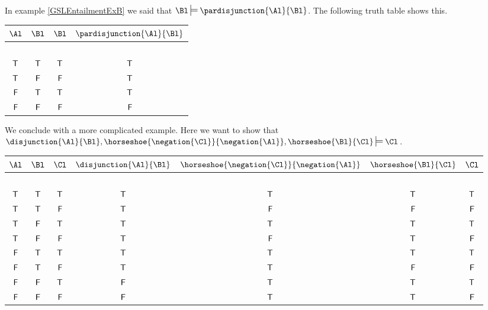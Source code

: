 \begin{majorILnc}{}
In example \ref{GSLEntailmentExB} we said that $\Bl\sdtstile{}{}\pardisjunction{\Al}{\Bl}$. 
The following truth table shows this. 
\begin{center}
\begin{tabular}{ c c c c }
$\Al$ & $\Bl$ & $\Bl$ & $\pardisjunction{\Al}{\Bl}$ \\
\hline
$ $ & $ $ & & \\[-.25cm]
$\mathsf{T}$ & $\mathsf{T}$ & $\mathsf{T}$ & $\mathsf{T}$ \\
$\mathsf{T}$ & $\mathsf{F}$& $\mathsf{F}$ & $\mathsf{T}$ \\
$\mathsf{F}$ & $\mathsf{T}$ & $\mathsf{T}$ & $\mathsf{T}$ \\
$\mathsf{F}$ & $\mathsf{F}$  & $\mathsf{F}$ & $\mathsf{F}$ \\
\end{tabular}
\end{center}
\end{majorILnc}
\begin{majorILnc}{}
We conclude with a more complicated example. 
Here we want to show that $\disjunction{\Al}{\Bl},\horseshoe{\negation{\Cl}}{\negation{\Al}},\horseshoe{\Bl}{\Cl}\sdtstile{}{}\Cl$.
\begin{center}
\begin{tabular}{ c c c c c c c }
$\Al$ & $\Bl$ & $\Cl$ & $\disjunction{\Al}{\Bl}$ & $\horseshoe{\negation{\Cl}}{\negation{\Al}}$ & $\horseshoe{\Bl}{\Cl}$ & $\Cl$ \\
\hline
$ $ & $ $ & & & & & \\[-.25cm]
$\mathsf{T}$ & $\mathsf{T}$ & $\mathsf{T}$ & $\mathsf{T}$ & $\mathsf{T}$ & $\mathsf{T}$ & $\mathsf{T}$\\
$\mathsf{T}$ & $\mathsf{T}$ & $\mathsf{F}$& $\mathsf{T}$ & $\mathsf{F}$ & $\mathsf{F}$ &  $\mathsf{F}$\\
$\mathsf{T}$ & $\mathsf{F}$ & $\mathsf{T}$ & $\mathsf{T}$ & $\mathsf{T}$ & $\mathsf{T}$ &  $\mathsf{T}$\\
$\mathsf{T}$ & $\mathsf{F}$ & $\mathsf{F}$  & $\mathsf{T}$ & $\mathsf{F}$ & $\mathsf{T}$ & $\mathsf{F}$\\
$\mathsf{F}$ & $\mathsf{T}$ & $\mathsf{T}$ & $\mathsf{T}$ & $\mathsf{T}$ & $\mathsf{T}$ & $\mathsf{T}$\\
$\mathsf{F}$ & $\mathsf{T}$ & $\mathsf{F}$& $\mathsf{T}$ & $\mathsf{T}$ & $\mathsf{F}$ & $\mathsf{F}$\\
$\mathsf{F}$ & $\mathsf{F}$ & $\mathsf{T}$ & $\mathsf{F}$ & $\mathsf{T}$ & $\mathsf{T}$ & $\mathsf{T}$\\
$\mathsf{F}$ & $\mathsf{F}$ & $\mathsf{F}$  & $\mathsf{F}$ & $\mathsf{T}$ & $\mathsf{T}$ & $\mathsf{F}$\\
\end{tabular}
\end{center}
\end{majorILnc}

